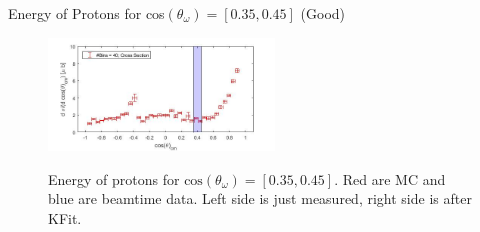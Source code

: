\documentclass[
		10pt
		]{beamer}
\begin{document}
\begin{frame}{Energy of Protons for cos$(\theta_{\omega})=[0.35,0.45]$ (Good)}
	
	\begin{figure}
		\hspace{0cm}  \vspace{-1cm}
		\includegraphics[width=6cm]{Plots/9}
	\end{figure}
	
	\begin{figure}%
		\centering
		\qquad
		\captionsetup{labelformat=empty}
		\caption{Energy of protons for $\textrm{cos}(\theta_{\omega}) = [0.35, 0.45] $. Red are MC and blue are beamtime data. Left side is just measured, right side is after KFit. }%
		\label{fig:example}%
	\end{figure}
	
\end{frame}
\end{document}
